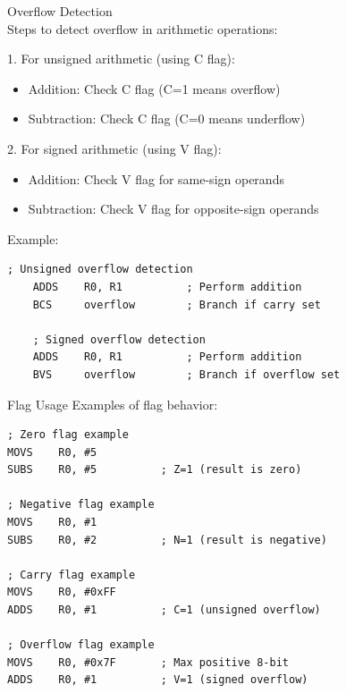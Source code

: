 \begin{KR}{Overflow Detection}\\
Steps to detect overflow in arithmetic operations:

1. For unsigned arithmetic (using C flag):
\begin{itemize}
  \item Addition: Check C flag (C=1 means overflow)
  \item Subtraction: Check C flag (C=0 means underflow)
\end{itemize}

2. For signed arithmetic (using V flag):
\begin{itemize}
  \item Addition: Check V flag for same-sign operands
  \item Subtraction: Check V flag for opposite-sign operands
\end{itemize}

Example:
\begin{lstlisting}[language=armasm, style=basesmol]
    ; Unsigned overflow detection
    ADDS    R0, R1          ; Perform addition
    BCS     overflow        ; Branch if carry set
    
    ; Signed overflow detection
    ADDS    R0, R1          ; Perform addition
    BVS     overflow        ; Branch if overflow set
\end{lstlisting}
\end{KR}

\begin{example2}{Flag Usage}
Examples of flag behavior:
\begin{lstlisting}[language=armasm, style=basesmol]
; Zero flag example
MOVS    R0, #5
SUBS    R0, #5          ; Z=1 (result is zero)

; Negative flag example
MOVS    R0, #1
SUBS    R0, #2          ; N=1 (result is negative)

; Carry flag example
MOVS    R0, #0xFF
ADDS    R0, #1          ; C=1 (unsigned overflow)

; Overflow flag example
MOVS    R0, #0x7F       ; Max positive 8-bit
ADDS    R0, #1          ; V=1 (signed overflow)
\end{lstlisting}
\end{example2}







